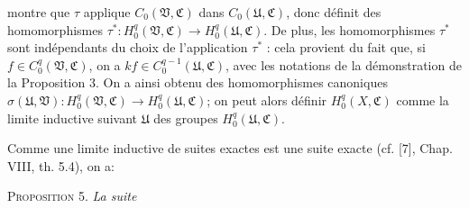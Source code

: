 montre que $\tau$ applique $C_0(\mathfrak{V}, \mathfrak{C})$ dans $C_0(\mathfrak{U}, \mathfrak{C})$, donc définit des homomorphismes $\tau^* : H_0^q(\mathfrak{V}, \mathfrak{C}) \to H_0^q(\mathfrak{U}, \mathfrak{C})$. De plus, les homomorphismes $\tau^*$ sont indépendants du choix de l'application $\tau^*$ : cela provient du fait que, si $f \in C_0^q(\mathfrak{V}, \mathfrak{C})$, on a $kf \in C_0^{q-1}(\mathfrak{U}, \mathfrak{C})$, avec les notations de la démonstration de la Proposition 3. On a ainsi obtenu des homomorphismes canoniques $\sigma(\mathfrak{U}, \mathfrak{V}) : H_0^q(\mathfrak{V}, \mathfrak{C}) \to H_0^q(\mathfrak{U}, \mathfrak{C})$; on peut alors définir $H_0^q(X, \mathfrak{C})$ comme la limite inductive suivant $\mathfrak{U}$ des groupes $H_0^q(\mathfrak{U}, \mathfrak{C})$.



%
%
%
Comme une limite inductive de suites exactes est une suite exacte (cf. [7], Chap. VIII, th. 5.4), on a:

\textsc{Proposition} 5. \textit{La suite}

